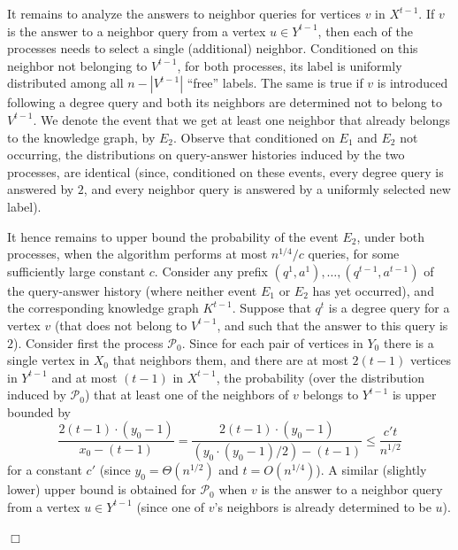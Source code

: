 \documentclass{article}
\newcommand{\calP}{{\mathcal{P}}}
\newenvironment{proof}{\smallskip\noindent{\bf Proof:}}%
        {\hspace*{\fill}$\Box$\par}
\newcommand{\ICALPCR}[1]{{#1}}
\begin{document}
\begin{proof}
It remains to analyze the answers to neighbor queries for vertices $v$ in $X^{t-1}$.
If $v$ is the answer to a neighbor query from a vertex $u \in Y^{t-1}$, then each of the processes needs to select a single (additional) neighbor. Conditioned on this neighbor not belonging to $V^{t-1}$, for both processes, its label is uniformly distributed among all $n-|V^{t-1}|$ ``free'' labels. The same is true if $v$ is introduced following a degree query and both its neighbors are determined not to belong to $V^{t-1}$. We denote the event that we get at least one neighbor that already belongs to the knowledge graph, by $E_2$. Observe that conditioned on $E_1$ and $E_2$ not occurring,  the distributions on query-answer histories induced by the two processes, are identical (since, conditioned on these events, every degree query is answered by $2$, and every neighbor query is answered by a uniformly selected new label).

It hence remains to upper bound the probability of the event $E_2$, under both processes, when the algorithm performs at most $n^{1/4}/c$ queries, for some sufficiently large constant $c$. Consider any prefix $(q^1,a^1),\dots,(q^{t-1},a^{t-1})$ of the query-answer history (where neither event $E_1$ or $E_2$ has yet occurred), and the corresponding knowledge graph $K^{t-1}$.
Suppose that $q^t$ is a degree query for a vertex $v$ (that does not belong to $V^{t-1}$, and such that the answer to this query is $2$). Consider first the process $\calP_0$. 
 Since for each pair of vertices in $Y_0$ there is a single vertex in $X_0$ that neighbors them, and there are at most $2(t-1)$ vertices in $Y^{t-1}$ \ICALPCR{and at most $(t-1)$ in $X^{t-1}$}, the probability (over the distribution induced by $\calP_0$) that at least one of the neighbors of $v$ belongs to $Y^{t-1}$ is upper bounded by
\ICALPCR{
$$\frac{2(t-1)\cdot (y_0-1)}{x_0 - (t-1)} = \frac{2(t-1)\cdot (y_0-1)}{(y_0\cdot(y_0-1)/2) - (t-1)} %
    \leq \frac{c' t}{n^{1/2}}$$
    }
 for a constant $c'$ (since $y_0 = \Theta(n^{1/2})$ and $t = O(n^{1/4})$). A similar (slightly lower) upper bound is obtained for $\calP_0$ when $v$ is the answer to a neighbor query from a vertex $u \in Y^{t-1}$ (since one of $v$'s neighbors is already determined to be $u$).


\end{proof}
\end{document}
